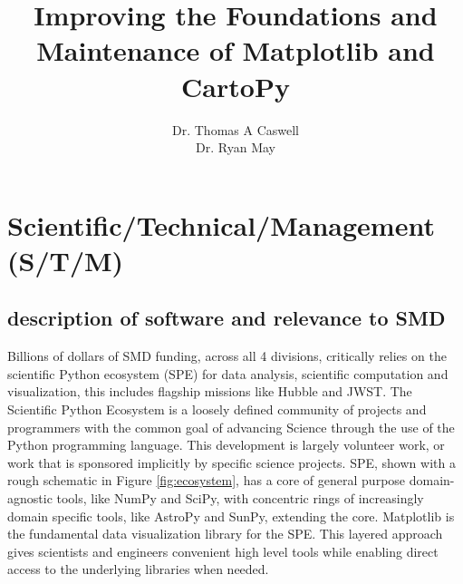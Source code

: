 \documentclass[12pt]{article}
\numberwithin{page}{section}
\begin{document}
\title{Improving the Foundations and Maintenance of Matplotlib and CartoPy}
\author{Dr. Thomas A Caswell\\Dr. Ryan May}
\date{}
\maketitle

\setcounter{tocdepth}{2}
\tableofcontents
\thispagestyle{empty}
\newpage

\section{Scientific/Technical/Management (S/T/M)}
\setcounter{page}{1}

\subsection{description of software and relevance to SMD}

Billions of dollars of SMD funding, across all 4 divisions, critically
relies on the scientific Python ecosystem (SPE) for data analysis,
scientific computation and visualization, this includes flagship
missions like Hubble and JWST.  The Scientific Python Ecosystem is a
loosely defined community of projects and programmers with the common
goal of advancing Science through the use of the Python programming
language.  This development is largely volunteer work, or work that is
sponsored implicitly by specific science projects.  SPE, shown with a
rough schematic in Figure \ref{fig:ecosystem}, has a core of general
purpose domain-agnostic tools, like NumPy\cite{Harris2020} and
SciPy\cite{Virtanen2020}, with concentric rings of increasingly domain
specific tools, like AstroPy\cite{robitaille2013astropy} and
SunPy\cite{sunpy_community2020}, extending the core.
Matplotlib\cite{Hunter:2007} is the fundamental data visualization
library for the SPE. This layered approach gives scientists and
engineers convenient high level tools while enabling direct access to
the underlying libraries when needed.
\end{document}
